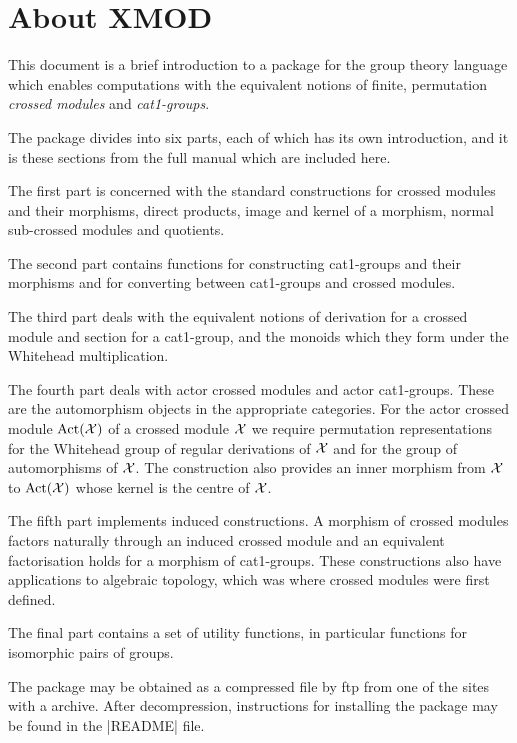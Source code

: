 \maketitle


\section{About XMOD}

This document is a brief introduction to a package for the {\GAP}
group theory language which enables computations with the 
equivalent notions of finite, permutation
{\em crossed modules} and {\em cat1-groups}.

The package divides into six parts, each of which has its own 
introduction, and it is these sections from the full manual
which are included here.

The first part is concerned with the standard constructions for crossed
modules and their morphisms, direct products, image and kernel of a morphism,
normal sub-crossed modules and quotients.

The second part contains functions for constructing cat1-groups
and their morphisms and for converting between cat1-groups and
crossed modules.

The third part deals with the equivalent notions of
derivation for a crossed module and section for a cat1-group,
and the monoids which they form under the Whitehead multiplication.

The fourth part deals with actor crossed modules and actor cat1-groups.
These are the automorphism objects in the appropriate categories.
For the actor crossed module ${\rm Act}({\cal X})$ of a
crossed module ${\cal X}$ we require permutation representations
for the Whitehead group of regular derivations of ${\cal X}$
and for the group of automorphisms of ${\cal X}$.
The construction also provides an inner morphism from  ${\cal X}$  
to  ${\rm Act}({\cal X})$  whose kernel is the centre of ${\cal X}$.

The fifth part implements induced constructions.
A morphism of crossed modules factors naturally through
an induced crossed module and an equivalent factorisation
holds for a morphism of cat1-groups.
These constructions also have applications to algebraic topology,
which was where crossed modules were first defined.

The final part contains a set of utility functions,
in particular functions for isomorphic pairs of groups.

The package may be obtained as a compressed file by ftp from one of 
the sites with a {\GAP} archive.  After decompression,
instructions for installing the package may be found in the |README| file.

